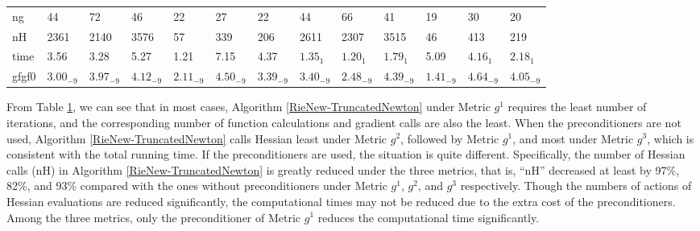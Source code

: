 \documentclass[11pt]{article}
\numberwithin{equation}{section}
\begin{document}
\begin{table}[htbp]
{\begin{tabular}{l|l|l|l|l|l|l|l|l|l|l|l|l}
      ng &      44 &      72 &      46 &      22 &      27 &      22 &      44 &      66 &      41 &      19 &      30 &      20 \\ 
      nH &    2361 &    2140 &    3576 &      57 &     339 &     206 &    2611 &    2307 &    3515 &      46 &     413 &     219 \\ 
    time & 3.56 & 3.28 & 5.27 & 1.21 & 7.15 & 4.37 & $1.35_{1}$ & $1.20_{1}$ & $1.79_{1}$& 5.09 & $4.16_{1}$ & $2.18_{1}$ \\ 
   gfgf0 & $3.00_{-9}$ & $3.97_{-9}$ & $4.12_{-9}$ & $2.11_{-9}$ & $4.50_{-9}$ & $3.39_{-9}$ & $3.40_{-9}$ & $2.48_{-9}$ & $4.39_{-9}$ & $1.41_{-9}$ & $4.64_{-9}$ & $4.05_{-9}$ \\  \hline
\end{tabular}
}
\label{NumExp-table1}
\end{table}

From Table \ref{NumExp-table1}, we can see that in most cases, Algorithm \ref{RieNew-TruncatedNewton} under Metric $g^1$ requires the least number of iterations, and the corresponding number of function calculations and gradient calls are also the least. When the preconditioners are not used, Algorithm \ref{RieNew-TruncatedNewton} calls Hessian least under Metric $g^2$, followed by Metric $g^1$, and most under Metric $g^3$, which is consistent with the total running time. If the preconditioners are used, the situation is quite different. Specifically, the number of Hessian calls (nH) in Algorithm \ref{RieNew-TruncatedNewton} is greatly reduced under the three metrics, that is, ``nH'' decreased at least by 97\%, 82\%, and 93\% compared with the ones without preconditioners under Metric $g^1$, $g^2$, and $g^3$ respectively. Though the numbers of actions of Hessian evaluations are reduced significantly, the computational times may not be reduced due to the extra cost of the preconditioners. Among the three metrics, only the preconditioner of Metric $g^1$ reduces the computational time significantly.
\end{document}
